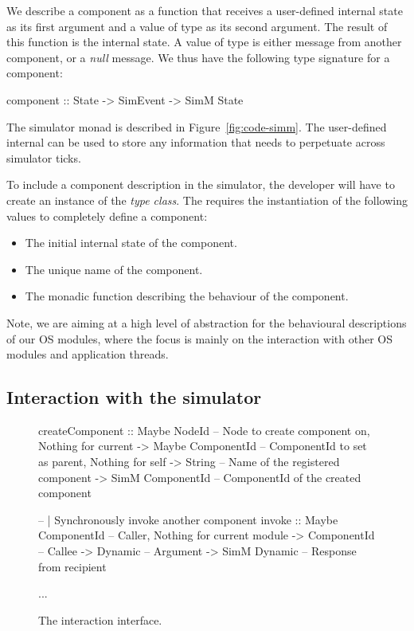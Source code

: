We describe a component as a function that receives a user-defined internal state as its first argument and a value of type  as its second argument.
The result of this function is the internal state.
A value of type  is either message from another component, or a \emph{null} message.
We thus have the following type signature for a component:
\begin{code}
component :: State -> SimEvent -> SimM State
\end{code}

The simulator monad  is described in Figure~\ref{fig:code-simm}. 
The user-defined internal  can be used to store any information that needs to perpetuate across simulator ticks.

To include a component description in the simulator, the developer will have to create an instance of the  \emph{type class}.
The  requires the instantiation of the following values to completely define a component:

\begin{itemize}
  \item The initial internal state of the component.
  \item The unique name of the component.
  \item The monadic function describing the behaviour of the component.
\end{itemize}

Note, we are aiming at a high level of abstraction for the behavioural descriptions of our OS modules, where the focus is mainly on the interaction with other OS modules and application threads.


\subsection{Interaction with the simulator}

\begin{figure*}
\centering
\begin{code}
createComponent :: Maybe NodeId      -- Node to create component on, Nothing for current
                -> Maybe ComponentId -- ComponentId to set as parent, Nothing for self
                -> String            -- Name of the registered component
                -> SimM ComponentId  -- ComponentId of the created component

-- | Synchronously invoke another component
invoke :: Maybe ComponentId -- Caller, Nothing for current module
       -> ComponentId       -- Callee
       -> Dynamic           -- Argument
       -> SimM Dynamic      -- Response from recipient

...
\end{code}
\caption{The interaction interface.}
\label{fig:comp-types}
\end{figure*}

